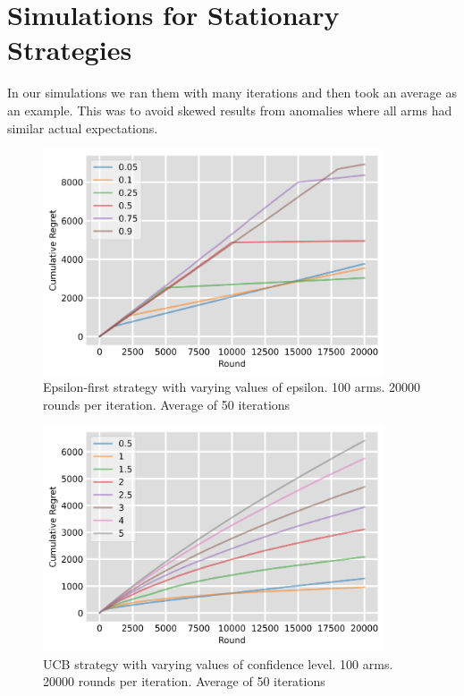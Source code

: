 \section{Simulations for Stationary Strategies}\label{sec:simulations-for-stationary-strategies}
In our simulations we ran them with many iterations and then took an average as an example. This was to avoid skewed results from anomalies where all arms had similar actual expectations.
\begin{figure}[h]
    \centering
    \includegraphics[width=0.9\textwidth]{figures/epsilon_plot}
    \caption[Epsilon-first strategy with varying values of epsilon]{Epsilon-first strategy with varying values of epsilon. 100 arms. 20000 rounds per iteration. Average of 50 iterations}
    \label{fig: epsilon}
\end{figure}

\begin{figure}[h]
    \centering
    \includegraphics[width=0.9\textwidth]{figures/ucb_plot}
    \caption[UCB strategy with varying values of confidence level]{UCB strategy with varying values of confidence level. 100 arms. 20000 rounds per iteration. Average of 50 iterations}
    \label{fig: ucb}
\end{figure}

